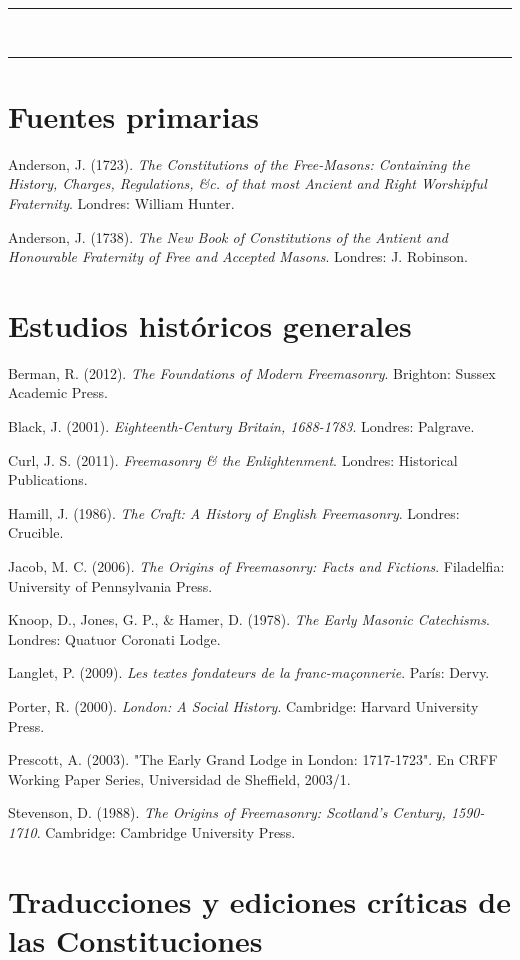 \documentclass[a4paper,12pt,twoside]{book}
\newcommand{\ornline}{%
\begin{center}
\textcolor{dorado}{{\LARGE\rule{0.2\textwidth}{0.4pt}}~\scalebox{1.2}{❧}~\scalebox{1.2}{❧}~\scalebox{1.2}{❧}~
{\LARGE\rule{0.2\textwidth}{0.4pt}}}
\end{center}}
\begin{document}
\ornline
\vspace{1cm}

\section*{Fuentes primarias}

Anderson, J. (1723). \textit{The Constitutions of the Free-Masons: Containing the History, Charges, Regulations, \&c. of that most Ancient and Right Worshipful Fraternity}. Londres: William Hunter.

Anderson, J. (1738). \textit{The New Book of Constitutions of the Antient and Honourable Fraternity of Free and Accepted Masons}. Londres: J. Robinson.

\section*{Estudios históricos generales}

Berman, R. (2012). \textit{The Foundations of Modern Freemasonry}. Brighton: Sussex Academic Press.

Black, J. (2001). \textit{Eighteenth-Century Britain, 1688-1783}. Londres: Palgrave.

Curl, J. S. (2011). \textit{Freemasonry \& the Enlightenment}. Londres: Historical Publications.

Hamill, J. (1986). \textit{The Craft: A History of English Freemasonry}. Londres: Crucible.

Jacob, M. C. (2006). \textit{The Origins of Freemasonry: Facts and Fictions}. Filadelfia: University of Pennsylvania Press.

Knoop, D., Jones, G. P., \& Hamer, D. (1978). \textit{The Early Masonic Catechisms}. Londres: Quatuor Coronati Lodge.

Langlet, P. (2009). \textit{Les textes fondateurs de la franc-maçonnerie}. París: Dervy.

Porter, R. (2000). \textit{London: A Social History}. Cambridge: Harvard University Press.

Prescott, A. (2003). "The Early Grand Lodge in London: 1717-1723". En CRFF Working Paper Series, Universidad de Sheffield, 2003/1.

Stevenson, D. (1988). \textit{The Origins of Freemasonry: Scotland's Century, 1590-1710}. Cambridge: Cambridge University Press.

\section*{Traducciones y ediciones críticas de las Constituciones}
\end{document}
